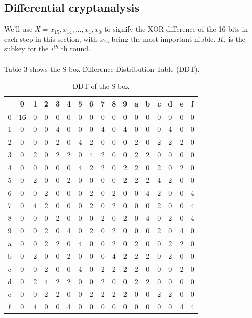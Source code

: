 \documentclass[journal=tosc,preprint]{iacrtrans}
\begin{document}
\subsection{Differential cryptanalysis}
We'll use $X = x_{15},x_{14},...,x_{1},x_{0}$ to signify the XOR difference of the 16 bits in each step in this section, with $x_15$ being the most important nibble. $K_i$ is the subkey for the $i^{th}$ th round.\\\\ 
Table 3 shows the S-box Difference Distribution Table (DDT).
\begin{table}[h!]
	\caption{DDT of the S-box}
	\centering
	
	\begin{tabular}{ |c||c|c|c|c|c|c|c|c|c|c|c|c|c|c|c|c| }
		\hline
		& 0 & 1 & 2 & 3&4& 5& 6&7&8&9&a&b&c&d&e&f  \\ \hline \hline
		0& 16 & 0 & 0 & 0 &0 &0 &0 &0& 0& 0 &0& 0& 0 &0& 0& 0 \\ 
		1& 0 & 0 & 0 & 4 & 0 & 0 & 0 & 4 & 0 & 4 &0& 0& 0 &4& 0& 0 \\
		2& 0 & 0 & 0 & 2 & 0 & 4 & 2 & 0 & 0 & 0 &2& 0& 2 &2& 2& 0 \\
		3& 0 & 2 & 0 & 2 & 2 & 0 & 4 & 2 & 0 & 0 &2& 2& 0 &0& 0& 0 \\
		4& 0 & 0 & 0 & 0 & 0 & 4 & 2 & 2 & 0 & 2 &2& 0& 2 &0& 2& 0 \\
		5& 0 & 2 & 0 & 0 & 2 & 0 & 0 & 0 & 0 & 2 &2& 2& 4 &2& 0& 0 \\
		6& 0 & 0 & 2 & 0 & 0 & 0 & 2 & 0 & 2 & 0 &0& 4& 2 &0& 0& 4 \\
		7& 0 & 4 & 2 & 0 & 0 & 0 & 2 & 0 & 2 & 0 & 0 & 0 & 2 & 0 & 0 & 4\\
		
		8& 0 & 0 & 0 & 2 & 0 & 0 & 0 & 2 & 0 & 2 & 0 & 4 & 0 & 2 & 0 & 4\\
		9& 0 & 0 & 2 & 0 & 4 & 0 & 2 & 0 & 2 & 0 & 0 & 0 & 2 & 0 & 4 & 0\\
		a& 0 & 0 & 2 & 2 & 0 & 4 & 0 & 0 & 2 & 0 & 2 & 0 & 0 & 2 & 2 & 0\\
		b& 0 & 2 & 0 & 0 & 2 & 0 & 0 & 0 & 4 & 2 & 2 & 2 & 0 & 2 & 0 & 0\\
		c& 0 & 0 & 2 & 0 & 0 & 4 & 0 & 2 & 2 & 2 & 2 & 0 & 0 & 0 & 2 & 0\\
		d& 0 & 2 & 4 & 2 & 2 & 0 & 0 & 2 & 0 & 0 & 2 & 2 & 0 & 0 & 0 & 0\\
		e& 0 & 0 & 2 & 2 & 0 & 0 & 2 & 2 & 2 & 2 & 0 & 0 & 2 & 2 & 0 & 0\\
		f& 0 & 4 & 0 & 0 & 4 & 0 & 0 & 0 & 0 & 0 & 0 & 0 & 0 & 0 & 4 & 4\\ \hline
	\end{tabular}
\end{table}\\
\end{document}
